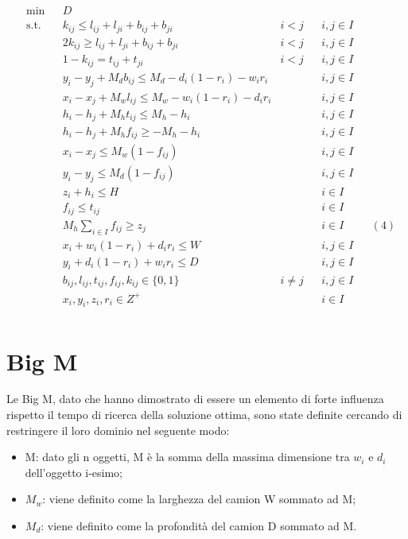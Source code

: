 \begin{equation*}
	\begin{aligned}
		& \underset{}{\text{min}}
		& & D \\
		& \text{s.t.} & & k_{ij} \leq l_{ij} + l_{ji} + b_{ij} + b_{ji} & i < j && i,j \in I \\
		& & & 2 k_{ij} \geq l_{ij} + l_{ji} + b_{ij} + b_{ji} & i < j && i,j \in I \\
		& & & 1 - k_{ij} = t_{ij} + t_{ji} & i < j && i,j \in I \\
		& & & y_i - y_j + M_d b_{ij} \leq M_d - d_i (1 - r_i) - w_i r_i & & & i,j \in I \\
		& & & x_i - x_j + M_w l_{ij} \leq M_w - w_i (1 - r_i) - d_i r_i & & & i,j \in I \\
		& & & h_i - h_j + M_h t_{ij} \leq M_h - h_i & & & i,j \in I \\
		& & & h_i - h_j + M_h f_{ij} \geq - M_h - h_i & & & i,j \in I \\
		& & & x_i - x_j \leq M_w (1-f_{ij}) & & & i,j \in I \\
		& & & y_i - y_j \leq M_d (1-f_{ij}) & & & i,j \in I \\
		& & & z_i + h_i \leq H & & & i \in I \\
		& & & f_{ij} \leq t_{ij} & & & i \in I \\
		  &   &   & M_h \sum_{i \in I} f_{ij} \geq z_j &   &   & i \in I &   & (4) \\
		& & & x_i + w_i (1 - r_i) + d_i r_i \leq W & & & i,j \in I \\
		& & & y_i + d_i (1 - r_i) + w_i r_i \leq D & & & i,j \in I \\
		& & & b_{ij}, l_{ij}, t_{ij}, f_{ij}, k_{ij} \in \{0,1\} & i \neq j & & i,j \in I \\
		& & & x_{i}, y_{i}, z_{i}, r_{i} \in Z^{+} & & & i \in I \\
	\end{aligned}
\end{equation*}

\section{Big M}
Le Big M, dato che hanno dimostrato di essere un elemento di forte influenza rispetto il tempo di ricerca della soluzione ottima, sono state definite cercando di restringere il loro dominio nel seguente modo:
\begin{itemize}
	\item M: dato gli n oggetti, M è la somma della massima dimensione tra $w_i$ e $d_i$ dell'oggetto i-esimo;
	\item $M_w$: viene definito come la larghezza del camion W sommato ad M;
	\item $M_d$: viene definito come la profondità del camion D sommato ad M.
\end{itemize}
